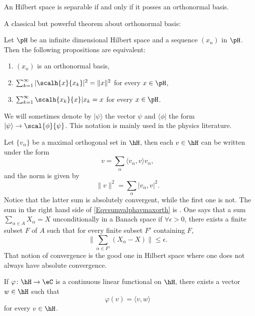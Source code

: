 \begin{theorem}
An Hilbert space is separable if and only if it posses an orthonormal basis.
\end{theorem}

A classical but powerful theorem about orthonormal basis:

\begin{theorem}
Let $\pH$ be an infinite dimensional Hilbert space and a sequence $(x_n)$ in $\pH$. Then the following propositions are equivalent:

\begin{enumerate}
\item $(x_n)$ is an orthonormal basis,
\item $\sum_{k=1}^{\infty}|\scalh{x}{x_k}|^2=\|x\|^2$ for every $x\in\pH$,
\item $\sum_{k=1}^{\infty}\scalh{x_k}{x}|x_k=x$ for every $x\in\pH$.
\end{enumerate}
\end{theorem}

We will sometimes denote by $|\psi\rangle$ the vector $\psi$ and $\langle\phi|$ the form $|\psi\rangle\to\scal{ \phi }{ \psi }$. This notation is mainly used in the physics literature.

Let $\{ v_{\alpha} \}$ be a maximal orthogonal set in $\hH$, then each $v\in\hH$ can be written under the form
\begin{equation}		\label{Eqvsumvalphavmaxorth}
	v=\sum_{\alpha}\langle v_{\alpha},v\rangle v_{\alpha},
\end{equation}
and the norm is given by
\begin{equation}
\| v \|^2=\sum_{\alpha}| v_{\alpha},v |^2.
\end{equation}
Notice that the latter sum is absolutely convergent, while the first one is not. The sum in the right hand side of \eqref{Eqvsumvalphavmaxorth} is . One says that a sum $\sum_{\alpha\in A} X_{\alpha}=X$ unconditionally in a Banach space if $\forall\epsilon>0$, there exists a finite subset $F$ of $A$ such that for every finite subset $F'$ containing $F$,
\[
  \| \sum_{\alpha\in F'}(X_{\alpha}-X)\| \leq \epsilon.
\]
That notion of convergence is the good one in Hilbert space where one does not always have absolute convergence.

\begin{theorem}		\label{ThoRiesz}
If $\varphi\colon \hH\to \eC$ is a continuous linear functional on $\hH$, there exists a vector $w\in\hH$ such that
\[
  \varphi(v)=\langle v, w\rangle
\]
for every $v\in\hH$.
\end{theorem}


